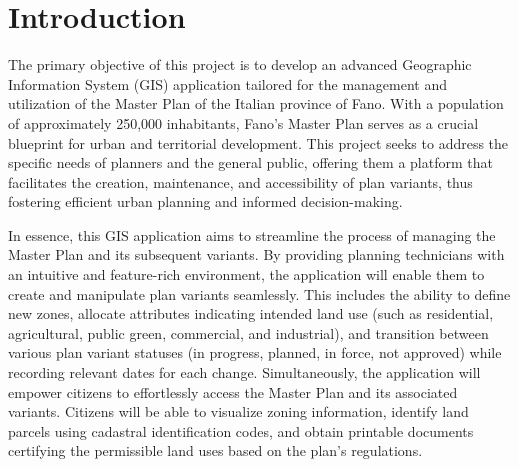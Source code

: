 
\chapter{Introduction}
\label{chp:Introduction}

The primary objective of this project is to develop an advanced Geographic Information System (GIS) application tailored for the management and utilization of the Master Plan of the Italian province of Fano. With a population of approximately 250,000 inhabitants, Fano's Master Plan serves as a crucial blueprint for urban and territorial development. This project seeks to address the specific needs of planners and the general public, offering them a platform that facilitates the creation, maintenance, and accessibility of plan variants, thus fostering efficient urban planning and informed decision-making.

In essence, this GIS application aims to streamline the process of managing the Master Plan and its subsequent variants. By providing planning technicians with an intuitive and feature-rich environment, the application will enable them to create and manipulate plan variants seamlessly. This includes the ability to define new zones, allocate attributes indicating intended land use (such as residential, agricultural, public green, commercial, and industrial), and transition between various plan variant statuses (in progress, planned, in force, not approved) while recording relevant dates for each change. Simultaneously, the application will empower citizens to effortlessly access the Master Plan and its associated variants. Citizens will be able to visualize zoning information, identify land parcels using cadastral identification codes, and obtain printable documents certifying the permissible land uses based on the plan's regulations.
